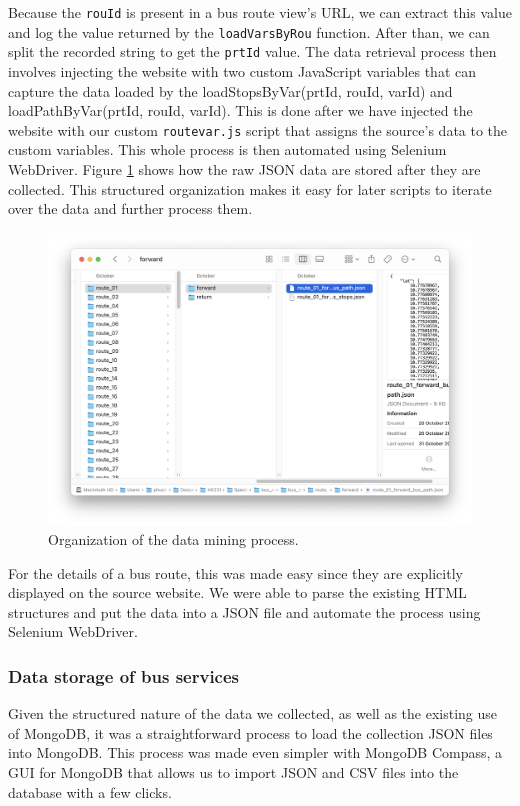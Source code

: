 Because the \lstinline{rouId} is present in a bus route view's URL, we can extract this value and log the value returned by the \lstinline{loadVarsByRou} function. After than, we can split the recorded string to get the \lstinline{prtId} value. The data retrieval process then involves injecting the website with two custom JavaScript variables that can capture the data loaded by the loadStopsByVar(prtId, rouId, varId) and loadPathByVar(prtId, rouId, varId). This is done after we have injected the website with our custom \lstinline{routevar.js} script that assigns the source's data to the custom variables. This whole process is then automated using Selenium WebDriver. Figure \ref{fig:data_org} shows how the raw JSON data are stored after they are collected. This structured organization makes it easy for later scripts to iterate over the data and further process them.

\begin{figure}[H]
    \centering
    \includegraphics[width=\textwidth]{assets/images/Implementation/data_org.png}
    \caption{Organization of the data mining process.}
    \label{fig:data_org}
\end{figure}

For the details of a bus route, this was made easy since they are explicitly displayed on the source website. We were able to parse the existing HTML structures and put the data into a JSON file and automate the process using Selenium WebDriver.

\subsubsection{Data storage of bus services}
Given the structured nature of the data we collected, as well as the existing use of MongoDB, it was a straightforward process to load the collection JSON files into MongoDB. This process was made even simpler with MongoDB Compass, a GUI for MongoDB that allows us to import JSON and CSV files into the database with a few clicks.

